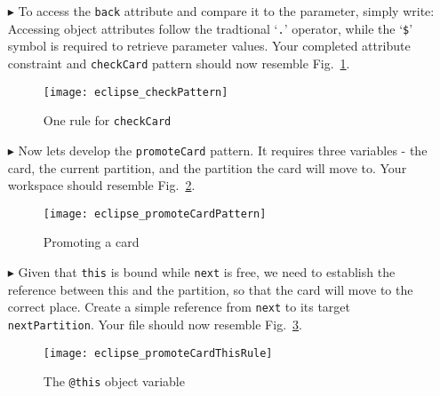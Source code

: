 \begin{itemize}
\item[$\blacktriangleright$] To access the \texttt{back} attribute and compare it to the parameter, simply write: 
Accessing object attributes follow the tradtional `\texttt{.}' operator, while the `\texttt{\$}' symbol is required to retrieve parameter values. Your completed
attribute constraint and \texttt{checkCard} pattern should now resemble Fig.~\ref{fig:checkPattern}.

\begin{figure}[htbp]
\begin{center}
  \texttt{[image: eclipse\_checkPattern]}
  \caption{One rule for \texttt{checkCard}}
  \label{fig:checkPattern}
\end{center}
\end{figure} 

\clearpage

\item[$\blacktriangleright$] Now lets develop the \texttt{promoteCard} pattern. It requires three variables - the card, the current partition, and the partition
the card will move to. Your workspace should resemble Fig.~\ref{fig:promoteCardPattern}.

\begin{figure}[htbp]
\begin{center}
  \texttt{[image: eclipse\_promoteCardPattern]}
  \caption{Promoting a card}
  \label{fig:promoteCardPattern}
\end{center}
\end{figure} 

\item[$\blacktriangleright$] Given that \texttt{this} is bound while \texttt{next} is free, we need to establish the reference between this and the
partition, so that the card will move to the correct place. Create a simple reference from \texttt{next} to its target \texttt{nextPartition}. Your file should
now resemble Fig.~\ref{fig:promoteThisRule}.

\vspace{0.5cm}

\begin{figure}[htbp]
\begin{center}
  \texttt{[image: eclipse\_promoteCardThisRule]}
  \caption{The \texttt{@this} object variable}
  \label{fig:promoteThisRule}
\end{center}
\end{figure} 


\end{itemize}
